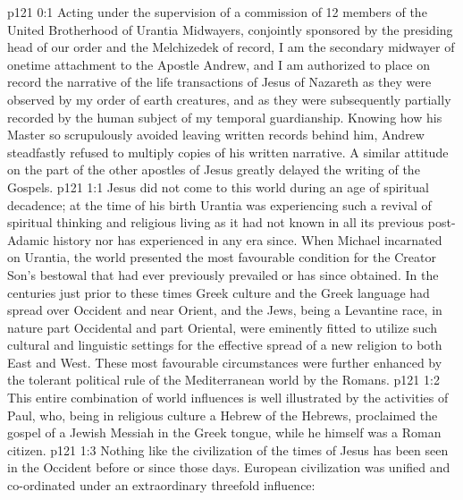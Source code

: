 \author{Midwayer Commission}
\vs p121 0:1 Acting under the supervision of a commission of 12 members of the United Brotherhood of Urantia Midwayers, conjointly sponsored by the presiding head of our order and the Melchizedek of record, I am the secondary midwayer of onetime attachment to the Apostle Andrew, and I am authorized to place on record the narrative of the life transactions of Jesus of Nazareth as they were observed by my order of earth creatures, and as they were subsequently partially recorded by the human subject of my temporal guardianship. Knowing how his Master so scrupulously avoided leaving written records behind him, Andrew steadfastly refused to multiply copies of his written narrative. A similar attitude on the part of the other apostles of Jesus greatly delayed the writing of the Gospels.
\vs p121 1:1 Jesus did not come to this world during an age of spiritual decadence; at the time of his birth Urantia was experiencing such a revival of spiritual thinking and religious living as it had not known in all its previous post\hyp{}Adamic history nor has experienced in any era since. When Michael incarnated on Urantia, the world presented the most favourable condition for the Creator Son’s bestowal that had ever previously prevailed or has since obtained. In the centuries just prior to these times Greek culture and the Greek language had spread over Occident and near Orient, and the Jews, being a Levantine race, in nature part Occidental and part Oriental, were eminently fitted to utilize such cultural and linguistic settings for the effective spread of a new religion to both East and West. These most favourable circumstances were further enhanced by the tolerant political rule of the Mediterranean world by the Romans.
\vs p121 1:2 This entire combination of world influences is well illustrated by the activities of Paul, who, being in religious culture a Hebrew of the Hebrews, proclaimed the gospel of a Jewish Messiah in the Greek tongue, while he himself was a Roman citizen.
\vs p121 1:3 Nothing like the civilization of the times of Jesus has been seen in the Occident before or since those days. European civilization was unified and co\hyp{}ordinated under an extraordinary threefold influence:
